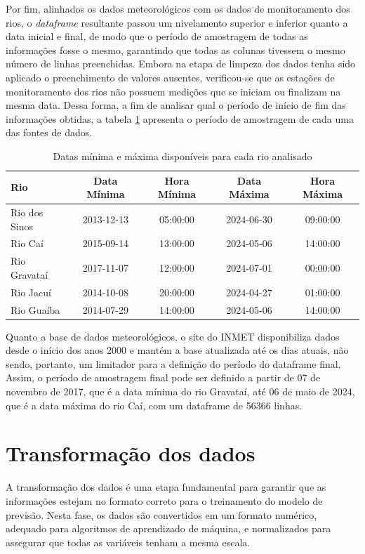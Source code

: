 Por fim, alinhados os dados meteorológicos com os dados de monitoramento dos rios, o \textit{dataframe} resultante passou um nivelamento superior e inferior quanto a data inicial e final, de modo que o período de amostragem de todas as informações fosse o mesmo, garantindo que todas as colunas tivessem o mesmo número de linhas preenchidas. Embora na etapa de limpeza dos dados tenha sido aplicado o preenchimento de valores ausentes, verificou-se que as estações de monitoramento dos rios não possuem medições que se iniciam ou finalizam na mesma data. Dessa forma, a fim de analisar qual o período de início de fim das informações obtidas, a tabela \ref{tab:periodo_amostragem} apresenta o período de amostragem de cada uma das fontes de dados.
\begin{table}[H]
	\centering
	\begin{tabular}{|l|c|c|c|c|}
	\hline
	\textbf{Rio} & \textbf{Data Mínima} & \textbf{Hora Mínima} & \textbf{Data Máxima} & \textbf{Hora Máxima} \\
	\hline
	Rio dos Sinos & 2013-12-13 & 05:00:00 & 2024-06-30 & 09:00:00 \\
	Rio Caí       & 2015-09-14 & 13:00:00 & 2024-05-06 & 14:00:00 \\
	Rio Gravataí  & 2017-11-07 & 12:00:00 & 2024-07-01 & 00:00:00 \\
	Rio Jacuí     & 2014-10-08 & 20:00:00 & 2024-04-27 & 01:00:00 \\
	Rio Guaíba    & 2014-07-29 & 14:00:00 & 2024-05-06 & 14:00:00 \\
	\hline
	\end{tabular}
	\caption{Datas mínima e máxima disponíveis para cada rio analisado}
	\label{tab:periodo_amostragem}
\end{table}

Quanto a base de dados meteorológicos, o site do INMET disponibiliza dados desde o início dos anos 2000 e mantém a base atualizada até os dias atuais, não sendo, portanto, um limitador para a definição do período do dataframe final. Assim, o período de amostragem final pode ser definido a partir de 07 de novembro de 2017, que é a data mínima do rio Gravataí, até 06 de maio de 2024, que é a data máxima do rio Caí, com um dataframe de 56366 linhas.

\section{Transformação dos dados}

A transformação dos dados é uma etapa fundamental para garantir que as informações estejam no formato correto para o treinamento do modelo de previsão. Nesta fase, os dados são convertidos em um formato numérico, adequado para algoritmos de aprendizado de máquina, e normalizados para assegurar que todas as variáveis tenham a mesma escala.


